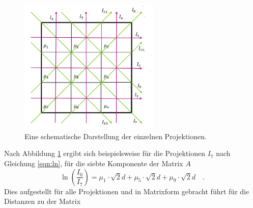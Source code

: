 \begin{figure}[H]
    \centering
    \includegraphics[width=0.6\textwidth]{latex/images/projektion.PNG}
    \caption{Eine schematische Darstellung der einzelnen Projektionen.}
    \label{img:proj}
\end{figure}
\noindent 
Nach Abbildung \ref{img:proj} ergibt sich beispielsweise für die Projektionen $I_7$ nach Gleichung \ref{eqn:ln}, für die siebte Komponente der Matrix $A$ 
\begin{equation*}
    \ln \left(\frac{I_0}{I_7}\right) = \mu_1 \cdot \sqrt{2}d + \mu_5 \cdot \sqrt{2}d +\mu_9 \cdot \sqrt{2}d \quad .
\end{equation*} 
Dies aufgestellt für alle Projektionen und in Matrixform gebracht führt für die Distanzen zu der Matrix




